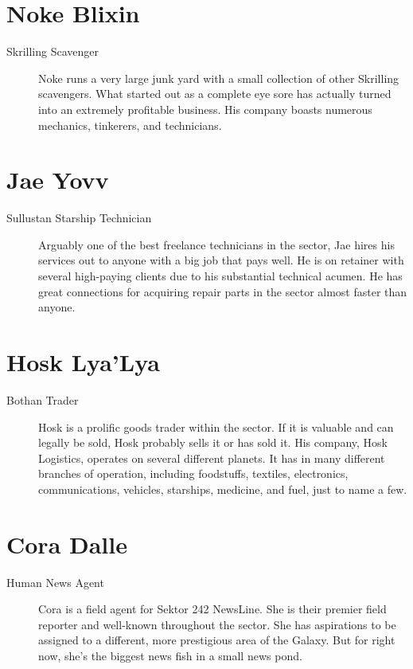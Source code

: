 \documentclass{article}
\begin{document}
\section{Noke Blixin}
\begin{description}
	\item [Skrilling \male Scavenger] Noke runs a very large junk yard with a small collection of other Skrilling scavengers. What started out as a complete eye sore has actually turned into an extremely profitable business. His company boasts numerous mechanics, tinkerers, and technicians.
\end{description}
\section{Jae Yovv}
\begin{description}
	\item [Sullustan \male Starship Technician] Arguably one of the best freelance technicians in the sector, Jae hires his services out to anyone with a big job that pays well. He is on retainer with several high-paying clients due to his substantial technical acumen. He has great connections for acquiring repair parts in the sector almost faster than anyone.
\end{description}
\section{Hosk Lya’Lya}
\begin{description}
	\item [Bothan \male Trader] Hosk is a prolific goods trader within the sector. If it is valuable and can legally be sold, Hosk probably sells it or has sold it. His company, Hosk Logistics, operates on several different planets. It has in many different branches of operation, including foodstuffs, textiles, electronics, communications, vehicles, starships, medicine, and fuel, just to name a few.
\end{description}
\section{Cora Dalle}
\begin{description}
	\item [Human \female News Agent] Cora is a field agent for Sektor 242 NewsLine. She is their premier field reporter and well-known throughout the sector. She has aspirations to be assigned to a different, more prestigious area of the Galaxy. But for right now, she’s the biggest news fish in a small news pond.
\end{description}
\end{document}
